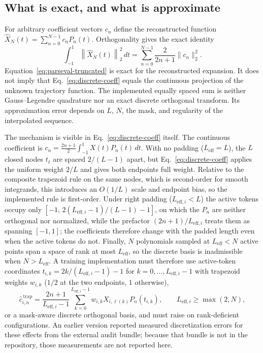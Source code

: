 \documentclass{article}
\begin{document}
\subsection{What is exact, and what is approximate}
\label{sec:exactness}

For arbitrary coefficient vectors $c_n$ define the reconstructed function
$\widehat X_N(t)=\sum_{n=0}^{N-1}c_nP_n(t)$.  Orthogonality gives the exact
identity
\begin{equation}
  \int_{-1}^{1}\left\|\widehat X_N(t)\right\|_2^2\,dt
  =\sum_{n=0}^{N-1}\frac{2}{2n+1}\|c_n\|_2^2.
  \label{eq:parseval-truncated}
\end{equation}
Equation~\eqref{eq:parseval-truncated} is exact for the reconstructed expansion.
It does not imply that Eq.~\eqref{eq:discrete-coeff} equals the continuous
projection of the unknown trajectory function.  The implemented equally
spaced sum is neither Gauss--Legendre quadrature nor an exact discrete
orthogonal transform.  Its approximation error depends on $L$, $N$, the mask,
and regularity of the interpolated sequence.

The mechanism is visible in Eq.~\eqref{eq:discrete-coeff} itself.  The
continuous coefficient is
$c_n=\frac{2n+1}{2}\int_{-1}^{1}X(t)P_n(t)\,dt$.  With no padding
($L_{\mathrm{eff}}=L$), the $L$ closed nodes $t_\ell$ are spaced $2/(L-1)$
apart, but Eq.~\eqref{eq:discrete-coeff} applies the uniform weight $2/L$ and
gives both endpoints full weight.  Relative to the composite trapezoid rule on
the same nodes, which is second-order for smooth integrands, this introduces
an $O(1/L)$ scale and endpoint bias, so the implemented rule is first-order.
Under right padding ($L_{\mathrm{eff},i}<L$) the active tokens occupy only
$[-1,\,2(L_{\mathrm{eff},i}-1)/(L-1)-1]$, on which the $P_n$ are neither
orthogonal nor normalized, while the prefactor $(2n+1)/L_{\mathrm{eff},i}$
treats them as spanning $[-1,1]$; the coefficients therefore change with the
padded length even when the active tokens do not.  Finally, $N$ polynomials
sampled at $L_{\mathrm{eff}}<N$ active points span a space of rank at most
$L_{\mathrm{eff}}$, so the discrete basis is inadmissible when
$N>L_{\mathrm{eff}}$.  A training implementation must therefore use
active-token coordinates $t_{i,k}=2k/(L_{\mathrm{eff},i}-1)-1$ for
$k=0,\ldots,L_{\mathrm{eff},i}-1$ with trapezoid weights $w_{i,k}$ ($1/2$ at
the two endpoints, $1$ otherwise),
\begin{equation}
  \widehat c^{\,\mathrm{trap}}_{i,n}
  =\frac{2n+1}{L_{\mathrm{eff},i}-1}\sum_{k=0}^{L_{\mathrm{eff},i}-1}
   w_{i,k}X_{i,\ell(k)}P_n(t_{i,k}),
  \qquad L_{\mathrm{eff},i}\geq\max(2,N),
\end{equation}
or a mask-aware discrete orthogonal basis, and must raise on rank-deficient
configurations.  An earlier version reported measured discretization errors
for these effects from the external audit bundle; because that bundle is not
in the repository, those measurements are not reported here.
\end{document}
